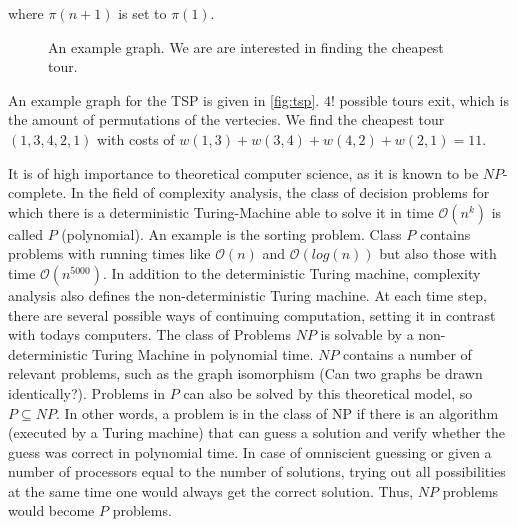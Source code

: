 \documentclass[10pt,a4paper,DIV=11]{scrreprt}
\begin{document}
where $\pi(n+1)$ is set to $\pi(1)$.\cite{MATHINF}\\

\begin{figure}[H]
\centering
\caption{An example graph. We are are interested in finding the cheapest tour.\cite{MATHINF}}
\label{fig:feedback}
\end{figure}

An example graph for the TSP is given in \ref{fig:tsp}. $4!$ possible tours exit, which is the amount of permutations of the vertecies.
We find the cheapest tour $(1, 3, 4, 2, 1)$ with costs of $w(1, 3) + w(3, 4) + w(4, 2) + w(2, 1) = 11$.

It is of high importance to theoretical computer science, as it is known to be $NP$-complete. In the field of complexity analysis, the class of decision problems for which there is a deterministic Turing-Machine able to solve it in time $\mathcal{O}(n^k)$ is called $P$ (polynomial). An example is the sorting problem. Class $P$ contains problems with running times like $\mathcal{O}(n)$ and $\mathcal{O}(log(n))$ but also those with time $\mathcal{O}(n^{5000})$. In addition to the deterministic Turing machine, complexity analysis also defines the non-deterministic Turing machine. At each time step, there are several possible ways of continuing computation, setting it in contrast with todays computers. The class of Problems $NP$ is solvable by a non-deterministic Turing Machine in polynomial time. $NP$ contains a number of relevant problems, such as the graph isomorphism (Can two graphs be drawn identically?). Problems in $P$ can also be solved by this theoretical model, so $P \subseteq NP$. In other words, a problem is in the class of NP if there is an algorithm (executed by a Turing machine) that can guess a solution and verify whether the guess was correct in polynomial time. In case of omniscient guessing or given a number of processors equal to the number of solutions, trying out all possibilities at the same time one would always get the correct solution. Thus, $NP$ problems would become $P$ problems. 
\end{document}
